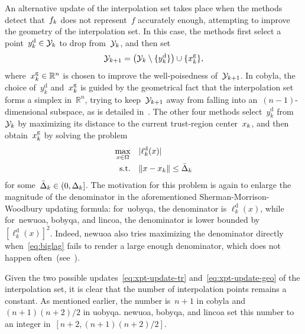 \documentclass[
    smallextended,  %
    final,        %
]{svjour3}
\newcommand{\R}{\mathbb{R}}
\newcommand{\abs}[2][]{#1\lvert#2#1\rvert}
\newcommand{\drop}{{\text{d}}}
\newcommand{\fset}{\Omega}
\newcommand{\geo}{{\text{g}}}
\newcommand{\iter}[1][k]{x\ifthenelse{\equal{#1}{}}{}{_{#1}}}
\newcommand{\norm}[2][]{#1\lVert#2#1\rVert}
\newcommand{\objm}[1][k]{\obj\ifthenelse{\equal{#1}{}}{}{_{#1}}}
\newcommand{\obj}{f}
\newcommand{\radalt}[1][k]{\bar{\Delta}\ifthenelse{\equal{#1}{}}{}{_{#1}}}
\newcommand{\rad}[1][k]{\Delta\ifthenelse{\equal{#1}{}}{}{_{#1}}}
\newcommand{\set}[2][]{#1\{#2#1\}}
\newcommand{\st}{\text{s.t.}}
\newcommand{\xpt}[1][k]{\mathcal{Y}\ifthenelse{\equal{#1}{}}{}{_{#1}}}
\begin{document}
An alternative update of the interpolation set takes place
when the methods detect that~$\objm$ does not represent~$\obj$ accurately enough, attempting
to improve the geometry of the interpolation set.
In this case, the methods first select a point~$y_k^{\drop} \in \xpt$ to drop from~$\xpt$, and then set
\begin{equation}
    \label{eq:xpt-update-geo}
    \xpt[k + 1] = \big(\xpt \setminus \set{y_k^{\drop}}\big) \cup \set{\iter^{\geo}},
\end{equation}
where~$\iter^{\geo} \in \R^n$ is chosen to improve the well-poisedness of~$\xpt[k + 1]$.
In \gls{cobyla}, the choice of~$y_k^{\drop}$ and~$\iter^{\geo}$ is guided by the geometrical fact
that the interpolation set forms a simplex in~$\R^n$, trying to keep~$\xpt[k+1]$ away from falling into
an~$(n-1)$-dimensional subspace, as is detailed in~\cite[equations~(15)--(17)]{Powell_1994}.
The other four methods select~$y_k^{\drop}$ from~$\xpt$ by maximizing its distance to
the current trust-region center~$\iter$, and then obtain~$\iter^{\geo}$ by solving the problem
\begin{equation}
    \label{eq:biglag}
    \begin{split}
        \max_{x \in \fset}  & \quad \abs{\ell_k^{\drop}(x)}\\
        \st                 & \quad \norm{x - \iter} \le \radalt
    \end{split}
\end{equation}
for some~$\radalt \in (0, \rad]$.
The motivation for this problem is again to enlarge the magnitude of the
denominator in the aforementioned Sherman-Morrison-Woodbury updating formula:
for~\gls{uobyqa}, the denominator is $\ell_k^{\drop}(x)$, while for~\gls{newuoa}, \gls{bobyqa},
and \gls{lincoa}, the denominator is lower bounded by $[\ell_k^{\drop}(x)]^2$.
Indeed, \gls{newuoa} also tries maximizing the denominator directly when~\eqref{eq:biglag}
fails to render a large enough denominator, which does not happen often~(see~\cite[\S~6]{Powell_2006}).

Given the two possible updates~\eqref{eq:xpt-update-tr} and~\eqref{eq:xpt-update-geo} of the
interpolation set, it is clear that the number of interpolation points remains a constant.
As mentioned earlier, the number is~$n+1$ in \gls{cobyla} and~$(n+1)(n+2)/2$ in \gls{uobyqa}.
\gls{newuoa}, \gls{bobyqa}, and \gls{lincoa} set this number to an integer in~$[n+2, (n+1)(n+2)/2]$.
\end{document}
